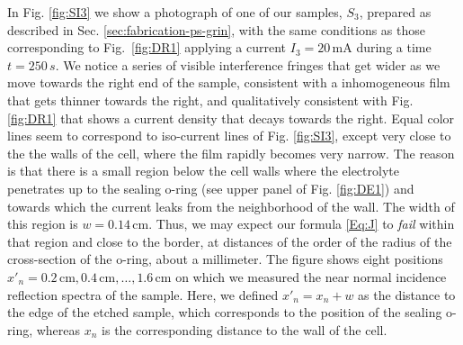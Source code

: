 \documentclass[review,sort&compress]{cas-sc}
\begin{document}
In Fig. \ref{fig:SI3} we show a photograph of one of our samples,
$S_3$,
prepared as described in Sec. \ref{sec:fabrication-ps-grin}, with the
same conditions as those corresponding to Fig.~\ref{fig:DR1} applying
a current
$I_3=20\,\text{mA}$ during a time $t=250\,s$. We notice a series of
visible interference fringes that get wider as we move towards the
right end of the sample, consistent with a inhomogeneous film that
gets thinner towards the right, and qualitatively consistent with
Fig. \ref{fig:DR1} that shows a current density that decays towards
the right. Equal color lines seem to correspond to iso-current lines of
Fig. \ref{fig:SI3}, except very close to the the walls of the cell,
where the film rapidly becomes very narrow. The reason is that there
is a small region below the cell walls where the electrolyte penetrates
up to the sealing o-ring (see upper panel of
Fig. \ref{fig:DE1}) and towards which the current leaks from the
neighborhood of the wall. The width of this region is
$w=0.14\,\text{cm}$. Thus, we may expect our formula \eqref{Eq:J}
to {\em fail} within that region and close to the border, at distances of the order of the radius
of the cross-section of the o-ring, about a millimeter. The
figure shows eight positions
$x'_n=0.2\,\text{cm},0.4\,\text{cm},\ldots,1.6\,\text{cm}$ on which we
measured the near normal incidence reflection spectra of the
sample. Here, we defined $x'_n=x_n+w$ as the distance to the edge of
the etched sample, which corresponds to the position of the sealing o-ring,
whereas $x_n$ is the corresponding distance to the wall of the
cell.
\end{document}
